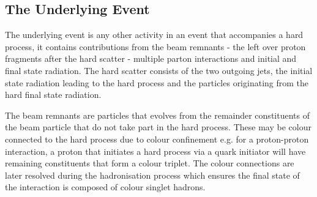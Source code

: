 \subsection{The Underlying Event}
\label{section: underlying event}

The underlying event is any other activity in an event that accompanies a hard process, it contains contributions from the beam remnants - the left over proton fragments after the hard scatter - multiple parton interactions and initial and final state radiation. The hard scatter consists of the two outgoing jets, the initial state radiation leading to the hard process and the particles originating from the hard final state radiation.

The beam remnants are particles that evolves from the remainder constituents of the beam particle that do not take part in the hard process. These may be colour connected to the hard process due to colour confinement e.g. for a proton-proton interaction, a proton that initiates a hard process via a quark initiator will have remaining constituents that form a colour triplet. The colour connections are later resolved during the hadronisation process which ensures the final state of the interaction is composed of colour singlet hadrons. 





